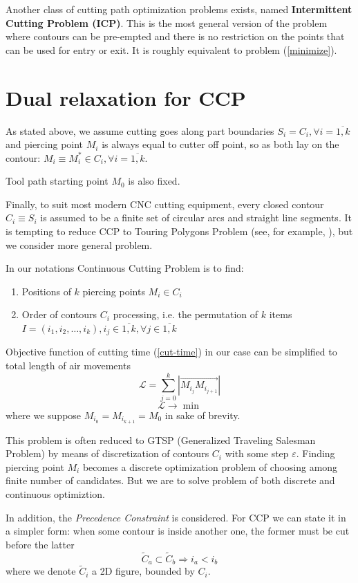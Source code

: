 \documentclass{ifacconf}
\begin{document}
Another class of cutting path optimization problems exists,
named \textbf{Intermittent Cutting Problem (ICP)}.
This is the most general version of the problem
where contours can be pre-empted and there is
no restriction on the points that can be used for entry or exit.
It is roughly equivalent to problem (\ref{minimize}).

\section{Dual relaxation for CCP}
As stated above,
we assume cutting goes along part boundaries
$S_i = C_i, \forall i=\overline{1, k}$
and piercing point $M_i$ is always equal to
cutter off point,
so as both lay on the contour:
$M_i \equiv M_i^* \in C_i, \forall i = \overline{1, k}$.

Tool path starting point $M_0$ is also fixed.

Finally,
to suit most modern CNC cutting equipment,
every closed contour $C_i \equiv S_i$
is assumed to be
a finite set of circular arcs
and straight line segments.
It is tempting to reduce
CCP to
Touring Polygons Problem
(see, for example, \cite{Qin2017Nov}),
but we consider more general problem.

In our notations Continuous Cutting Problem is to find:
\begin{enumerate}
  \item Positions of $k$ piercing points $M_i \in C_i$
  \item Order of contours $C_i$ processing,
  i.e. the permutation of $k$ items
  $I=(i_1, i_2, \dots, i_k),
    i_j \in \overline{1,k}, \forall j \in \overline{1,k}$
\end{enumerate}
Objective function of cutting time (\ref{cut-time})
in our case can be simplified to total length of air movements
$$
\mathcal L = \sum_{j=0}^k |\overrightarrow{M_{i_j} M_{i_{{j+1}}}}|
$$
$$
\mathcal L \to \min
$$
where we suppose
$M_{i_0} = M_{i_{k+1}} = M_0$
in sake of brevity.

This problem is often
reduced to GTSP
(Generalized Traveling Salesman Problem)
by means of
discretization of contours $C_i$
with some step $\varepsilon$.
Finding piercing point $M_i$
becomes a discrete optimization problem
of choosing among finite number of
candidates.
But we are to solve
problem of both discrete and
continuous optimiztion.

In addition,
the \textit{Precedence Constraint}
is considered.
For CCP we can state it in a simpler form:
when some contour is inside another one,
the former must be cut
before the latter
$$
\tilde C_a \subset \tilde C_b
\Rightarrow
i_a < i_b
$$
where we denote
$\tilde C_i$ a 2D figure,
bounded by $C_i$.
\end{document}
